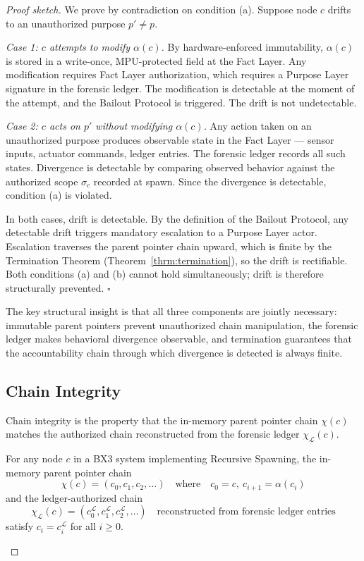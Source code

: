 \begin{proof}[Proof sketch]
We prove by contradiction on condition (a). Suppose node $c$ drifts to an unauthorized purpose $p' \neq p$.

\textit{Case 1: $c$ attempts to modify $\alpha(c)$.} By hardware-enforced immutability, $\alpha(c)$ is stored in a write-once, MPU-protected field at the Fact Layer. Any modification requires Fact Layer authorization, which requires a Purpose Layer signature in the forensic ledger. The modification is detectable at the moment of the attempt, and the Bailout Protocol is triggered. The drift is not undetectable.

\textit{Case 2: $c$ acts on $p'$ without modifying $\alpha(c)$.} Any action taken on an unauthorized purpose produces observable state in the Fact Layer — sensor inputs, actuator commands, ledger entries. The forensic ledger records all such states. Divergence is detectable by comparing observed behavior against the authorized scope $\sigma_c$ recorded at spawn. Since the divergence is detectable, condition (a) is violated.

In both cases, drift is detectable. By the definition of the Bailout Protocol, any detectable drift triggers mandatory escalation to a Purpose Layer actor. Escalation traverses the parent pointer chain upward, which is finite by the Termination Theorem (Theorem~\ref{thrm:termination}), so the drift is rectifiable. Both conditions (a) and (b) cannot hold simultaneously; drift is therefore structurally prevented. $\square$
\endproof

The key structural insight is that all three components are jointly necessary: immutable parent pointers prevent unauthorized chain manipulation, the forensic ledger makes behavioral divergence observable, and termination guarantees that the accountability chain through which divergence is detected is always finite.

\subsection{Chain Integrity}
\label{sec:chain-integrity}

Chain integrity is the property that the in-memory parent pointer chain $\chi(c)$ matches the authorized chain reconstructed from the forensic ledger $\chi_{\mathcal{L}}(c)$.

\begin{thrm}
\label{thrm:chain-integrity}
For any node $c$ in a BX3 system implementing Recursive Spawning, the in-memory parent pointer chain
\begin{equation}
\chi(c) = (c_0, c_1, c_2, \ldots)
\quad\text{where}\quad
c_0 = c,\ c_{i+1} = \alpha(c_i)
\end{equation}
and the ledger-authorized chain
\begin{equation}
\chi_{\mathcal{L}}(c) = (c_0^{\mathcal{L}}, c_1^{\mathcal{L}}, c_2^{\mathcal{L}}, \ldots)
\quad\text{reconstructed from forensic ledger entries}
\end{equation}
satisfy $c_i = c_i^{\mathcal{L}}$ for all $i \geq 0$.
\end{thrm}


\end{proof}
